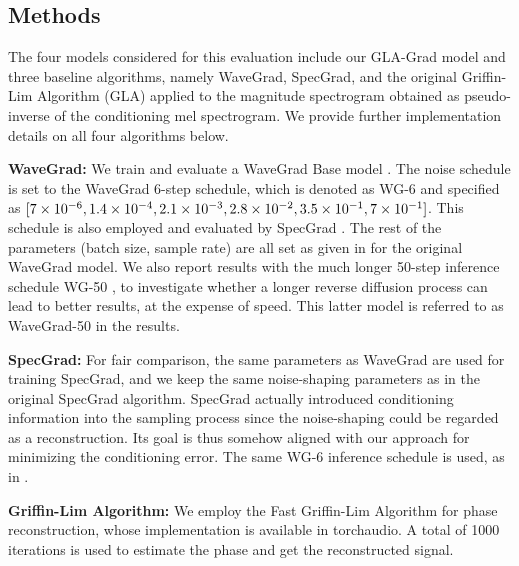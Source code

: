 \subsection{Methods}
The four models considered for this evaluation include our GLA-Grad model and three baseline algorithms, namely WaveGrad, SpecGrad, and the original Griffin-Lim Algorithm (GLA) applied to the magnitude spectrogram obtained as pseudo-inverse of the conditioning mel spectrogram. %
We provide further implementation details on all four algorithms below.

\textbf{WaveGrad:} We train and evaluate a WaveGrad Base model \cite{chen2020wavegrad}. The noise schedule is set to the WaveGrad 6-step schedule, which is denoted as WG-6 and specified as %
$[\num{7e-6}, \num{1.4E-4}, \num{2.1E-3}, \num{2.8E-2}, \num{3.5E-1}, \num{7E-1}]$. 
This schedule is also employed and evaluated by SpecGrad \cite{koizumi2022specgrad}.
The rest of the parameters (batch size, sample rate) are all set as given in \cite{chen2020wavegrad} for the original WaveGrad model. We also report results with the much longer 50-step inference schedule WG-50  \cite{chen2020wavegrad}, to investigate whether a longer reverse diffusion process can lead to better results, at the expense of speed. This latter model is referred to as WaveGrad-50 in the results.

\textbf{SpecGrad:} For fair comparison, the same parameters as WaveGrad are used for training SpecGrad, and we keep the same noise-shaping parameters as in the original SpecGrad algorithm. 
SpecGrad actually introduced conditioning information into the sampling process since the noise-shaping could be regarded as a reconstruction. 
Its goal is thus somehow aligned with our approach for minimizing the conditioning error. The same WG-6 inference schedule is used, as in \cite{koizumi2022specgrad}.

\textbf{Griffin-Lim Algorithm:} We employ the Fast Griffin-Lim Algorithm \cite{perraudin2013fast} for phase reconstruction, whose implementation is available in torchaudio. A total of 1000 iterations is used to estimate the phase and get the reconstructed signal. %

